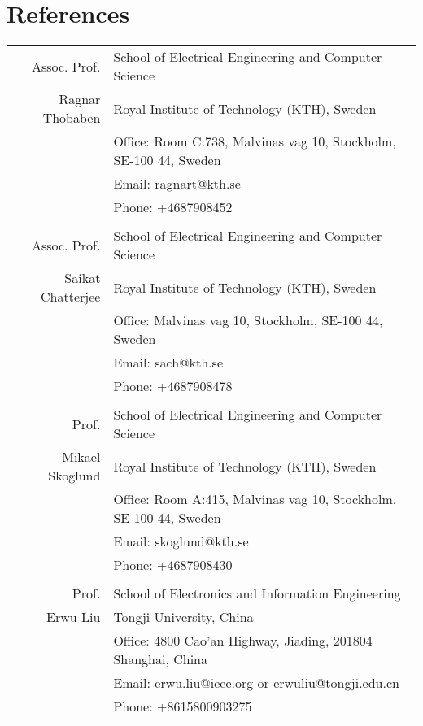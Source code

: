\documentclass[a4paper,10pt]{article}
\begin{document}
\section{References}
\begin{longtable}[H]{r|p{13.5cm}}
  Assoc. Prof. & School of Electrical Engineering and Computer Science\\
  Ragnar Thobaben &Royal Institute of Technology (KTH), Sweden \\
               & Office: Room C:738, Malvinas vag 10, Stockholm, SE-100 44, Sweden \\
               & Email: ragnart@kth.se \\
               & Phone: +4687908452 \\

  \multicolumn{2}{c}{} \\
  Assoc. Prof. & School of Electrical Engineering and Computer Science\\
  Saikat Chatterjee &Royal Institute of Technology (KTH), Sweden \\
               & Office: Malvinas vag 10, Stockholm, SE-100 44, Sweden \\
               & Email: sach@kth.se \\
               & Phone: +4687908478 \\

  \multicolumn{2}{c}{} \\

  Prof.  & School of Electrical Engineering and Computer Science \\
  Mikael Skoglund &Royal Institute of Technology (KTH), Sweden \\
               & Office: Room A:415, Malvinas vag 10, Stockholm, SE-100 44, Sweden \\
               & Email: skoglund@kth.se \\
               & Phone: +4687908430 \\

  \multicolumn{2}{c}{} \\
  Prof. & School of Electronics and Information Engineering \\
  Erwu Liu &Tongji University, China \\
               & Office: 4800 Cao'an Highway, Jiading, 201804 Shanghai, China\\
               & Email: erwu.liu@ieee.org or erwuliu@tongji.edu.cn \\
               & Phone: +8615800903275
\end{longtable}
\end{document}

